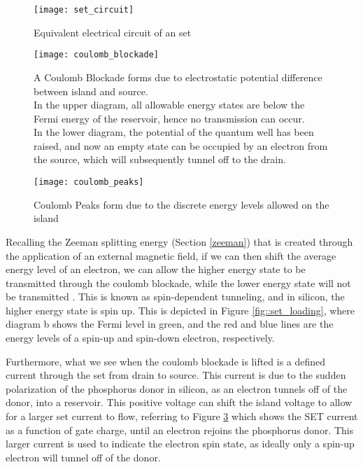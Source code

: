 	\begin{figure}[htbp!]
		\centering
		\texttt{[image: set\_circuit]}
		\caption[Equivalent circuit of an \gls{set}]{Equivalent electrical circuit of an \gls{set}\cite{devoret2000amplifying}}
		\label{fig::set_circuit}
	\end{figure}
	
	\begin{figure}[htbp!]
		\centering
		\texttt{[image: coulomb\_blockade]}
		\caption[A Coulomb Blockade]{A Coulomb Blockade \cite{coulomb_blockade} forms due to electrostatic potential difference between island and source.\\ In the upper diagram, all allowable energy states are below the Fermi energy of the reservoir, hence no transmission can occur.\\ In the lower diagram, the potential of the quantum well has been raised, and now an empty state can be occupied by an electron from the source, which will subsequently tunnel off to the drain.}
		\label{fig::coulomb_blockade}
	\end{figure}
	
	\begin{figure}[htbp!]
		\centering
		\texttt{[image: coulomb\_peaks]}
		\caption[Coulomb Peaks]{Coulomb Peaks form due to the discrete energy levels allowed on the island\cite{elec9705_lecture}}
		\label{fig::coulomb_peaks}
	\end{figure}
	
	
	
	Recalling the Zeeman splitting energy (Section \ref{zeeman}) that is created through the application of an external magnetic field, if we can then shift the average energy level of an electron, we can allow the higher energy state to be transmitted through the coulomb blockade, while the lower energy state will not be transmitted . This is known as spin-dependent tunneling, and in silicon, the higher energy state is spin up. This is depicted in Figure \ref{fig::set_loading}, where diagram b shows the Fermi level in green, and the red and blue lines are the energy levels of a spin-up and spin-down electron, respectively. 
	
	Furthermore, what we see when the coulomb blockade is lifted is a defined current through the \gls{set} from drain to source. This current is due to the sudden polarization of the phosphorus donor in silicon, as an electron tunnels off of the donor, into a reservoir. This positive voltage can shift the island voltage to allow for a larger \gls{set} current to flow, referring to Figure \ref{fig::coulomb_peaks} which shows the SET current as a function of gate charge, until an electron rejoins the phosphorus donor. This larger current is used to indicate the electron spin state, as ideally only a spin-up electron will tunnel off of the donor.
	
